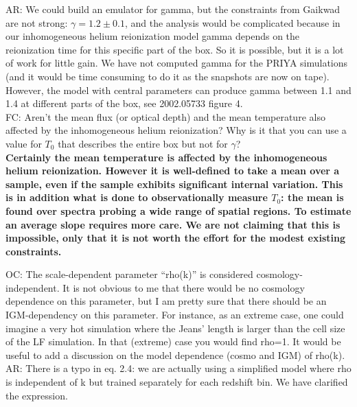 \documentclass[12pt]{article}
\begin{document}
AR: We could build an emulator for gamma, but the constraints from Gaikwad are not strong: $\gamma = 1.2\pm 0.1$, and the analysis would be complicated because in our inhomogeneous helium reionization model gamma depends on the reionization time for this specific part of the box. So it is possible, but it is a lot of work for little gain. We have not computed gamma for the PRIYA simulations (and it would be time consuming to do it as the snapshots are now on tape). However, the model with central parameters can produce gamma between 1.1 and 1.4 at different parts of the box, see 2002.05733 figure 4.\\

FC: Aren’t the mean flux (or optical depth) and the mean temperature also affected by the inhomogeneous helium reionization? Why is it that you can use a value for $T_0$ that describes the entire box but not for $\gamma$?\\

\textbf{Certainly the mean temperature is affected by the inhomogeneous helium reionization. However it is well-defined to take a mean over a sample, even if the sample exhibits significant internal variation. This is in addition what is done to observationally measure $T_0$: the mean is found over spectra probing a wide range of spatial regions. To estimate an average slope requires more care. We are not claiming that this is impossible, only that it is not worth the effort for the modest existing constraints.}\\

\hrulefill \newline

OC: The scale-dependent parameter “rho(k)” is considered cosmology-independent. It is not obvious to me that there would be no cosmology dependence on this parameter, but I am pretty sure that there should be an IGM-dependency on this parameter. For instance, as an extreme case, one could imagine a very hot simulation where the Jeans’ length is larger than the cell size of the LF simulation. In that (extreme) case you would find rho=1. It would be useful to add a discussion on the model dependence (cosmo and IGM) of rho(k).\\

AR: There is a typo in eq. 2.4: we are actually using a simplified model where rho is independent of k but trained separately for each redshift bin. We have clarified the expression.
\end{document}

